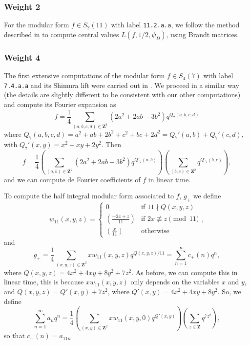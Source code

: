\documentclass[11pt]{amsart}
\newcommand{\Z}{\ensuremath{\mathbf{Z}}}
\begin{document}
\subsubsection{Weight 2}  For the modular form $f\in S_2(11)$ with label \texttt{11.2.a.a}, we follow the method described in \cite{MRVT} to compute central values $L(f,1/2,\psi_D)$, using Brandt matrices.

\subsubsection{Weight 4}
The first extensive computations of the modular form $f\in S_4(7)$ with label \texttt{7.4.a.a} and its Shimura lift were carried out in \cite{TR}.   We proceed in a similar way (the details are slightly different to be consistent with our other computations) and compute its Fourier expansion as
\[f = \frac{1}{4}\sum_{(a, b, c, d)\in\Z^4}(2a^2+2ab-3b^2)q^{Q_7(a, b, c, d)}\]
where $Q_7(a, b, c, d) = a^2 + ab +2b^2 + c^2 + bc + 2d^2 = Q_7'(a, b) + Q_7'(c, d)$, with $Q_7'(x, y) = x^2 + xy + 2y^2$.
Then
\[f = \frac{1}{4}\left(\sum_{(a, b)\in\Z^2}(2a^2+2ab-3b^2)q^{Q'_7(a, b)}\right)\left(\sum_{(b, c)\in\Z^2}q^{Q'_7(b, c)}\right),\]
and we can compute de Fourier coefficients of $f$ in linear time.

To compute the half integral modular form associated to $f$, $g_+$ we define
\[
w_{11}(x, y, z) = \left\{
\begin{array}{ll}
0&\text{if }11\nmid Q(x, y, z)\\
\left(\frac{-2x+z}{11}\right)&\text{if }2x\not\equiv z\pmod{11}\\
\left(\frac{x}{11}\right)&\text{otherwise}
\end{array}
\right.,
\]
and
\[g_+ = \frac{1}{4}\sum_{(x, y, z)\in\Z^3}xw_{11}(x, y, z)q^{Q(x, y, z)/11}=\sum_{n=1}^\infty c_+(n)q^n,\]
where $Q(x, y, z) = 4x^2+4xy+8y^2+7z^2$.
As before, we can compute this in linear time, this is because $xw_{11}(x, y, z)$ only depends on the variables $x$ and $y$,
and $Q(x, y, z) = Q'(x, y) + 7z^2$, where $Q'(x, y) = 4x^2+4xy+8y^2$.
So,
we define
\[
\sum_{n=1}^\infty a_n q^n = \frac{1}{4}\left(\sum_{(x, y)\in\Z^2}xw_{11}(x, y, 0)q^{Q'(x, y)}\right)\left(\sum_{z\in\Z}q^{7z^2}\right),
\]
so that
$c_+(n) = a_{11n}$.
\end{document}
